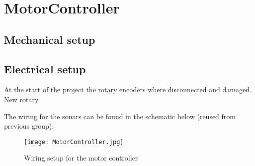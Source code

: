 \section{MotorController}


\subsection{Mechanical setup}


\subsection{Electrical setup}
At the start of the project the rotary encoders where disconnected and damaged. 
New rotary

The wiring for the sonars can be found in the schematic below (reused from previous group):

\begin{figure}[H]
\centering
\texttt{[image: MotorController.jpg]}
\caption{Wiring setup for the motor controller}
\label{fig::wiringMotor}
\end{figure}

 
    